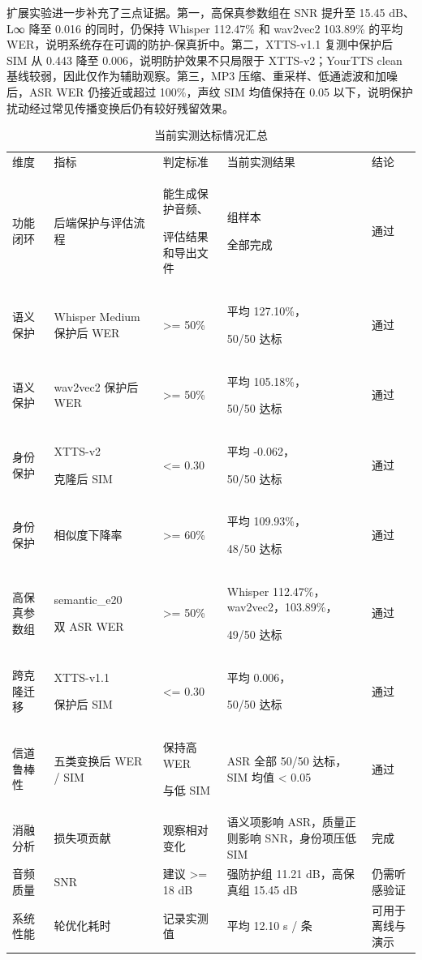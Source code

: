 扩展实验进一步补充了三点证据。第一，高保真参数组在 SNR 提升至 15.45
dB、L∞ 降至 0.016 的同时，仍保持 Whisper 112.47\% 和 wav2vec2 103.89\%
的平均 WER，说明系统存在可调的防护-保真折中。第二，XTTS-v1.1
复测中保护后 SIM 从 0.443 降至 0.006，说明防护效果不只局限于
XTTS-v2；YourTTS clean 基线较弱，因此仅作为辅助观察。第三，MP3
压缩、重采样、低通滤波和加噪后，ASR WER 仍接近或超过 100\%，声纹 SIM
均值保持在 0.05 以下，说明保护扰动经过常见传播变换后仍有较好残留效果。

{\def\LTcaptype{table} %
\begin{longtable}[]{@{}
  >{\centering\arraybackslash}m{}
  >{\centering\arraybackslash}m{}
  >{\centering\arraybackslash}m{}
  >{\centering\arraybackslash}m{}
  >{\centering\arraybackslash}m{}@{}}
\caption{当前实测达标情况汇总}\\
\toprule\noalign{}
\endhead
\bottomrule\noalign{}
\endlastfoot
维度 & 指标 & 判定标准 & 当前实测结果 & 结论 \\
功能闭环 & 后端保护与评估流程 & 能生成保护音频、

评估结果和导出文件 & 50 组样本

全部完成 & 通过 \\
语义保护 & Whisper Medium 保护后 WER & \textgreater= 50\% & 平均
127.10\%，

50/50 达标 & 通过 \\
语义保护 & wav2vec2 保护后 WER & \textgreater= 50\% & 平均 105.18\%，

50/50 达标 & 通过 \\
身份保护 & XTTS-v2

克隆后 SIM & \textless= 0.30 & 平均 -0.062，

50/50 达标 & 通过 \\
身份保护 & 相似度下降率 & \textgreater= 60\% & 平均 109.93\%，

48/50 达标 & 通过 \\
高保真参数组 & semantic\_e20

双 ASR WER & \textgreater= 50\% & Whisper 112.47\%，wav2vec2，103.89\%，

49/50 达标 & 通过 \\
跨克隆迁移 & XTTS-v1.1

保护后 SIM & \textless= 0.30 & 平均 0.006，

50/50 达标 & 通过 \\
信道鲁棒性 & 五类变换后 WER / SIM & 保持高 WER

与低 SIM & ASR 全部 50/50 达标，SIM 均值 \textless{} 0.05 & 通过 \\
消融分析 & 损失项贡献 & 观察相对变化 & 语义项影响 ASR，质量正则影响
SNR，身份项压低 SIM & 完成 \\
音频质量 & SNR & 建议 \textgreater= 18 dB & 强防护组 11.21 dB，高保真组
15.45 dB & 仍需听感验证 \\
系统性能 & 50 轮优化耗时 & 记录实测值 & 平均 12.10 s / 条 &
可用于离线与演示 \\
\end{longtable}
}

